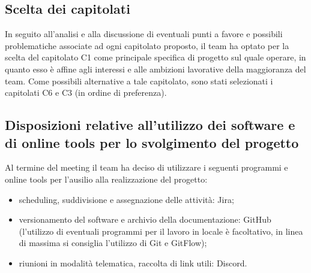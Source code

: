 \subsection{Scelta dei capitolati}
In seguito all'analisi e alla discussione di eventuali punti a favore e possibili problematiche associate ad ogni capitolato proposto, il team ha optato per la scelta del capitolato C1 come principale specifica di progetto sul quale operare, in quanto esso è affine agli interessi e alle ambizioni lavorative della maggioranza del team. Come possibili alternative a tale capitolato, sono stati selezionati i capitolati C6 e C3 (in ordine di preferenza).
\subsection{Disposizioni relative all'utilizzo dei software e di online tools per lo svolgimento del progetto }
Al termine del meeting il team ha deciso di utilizzare i seguenti programmi e online tools per l'ausilio alla realizzazione del progetto:
\begin{itemize}
	\item scheduling, suddivisione e assegnazione delle attività: Jira;
	\item versionamento del software e archivio della documentazione: GitHub (l'utilizzo di eventuali programmi per il lavoro in locale è facoltativo, in linea di massima si consiglia l'utilizzo di Git e GitFlow);
	\item riunioni in modalità telematica, raccolta di link utili: Discord.
\end{itemize}